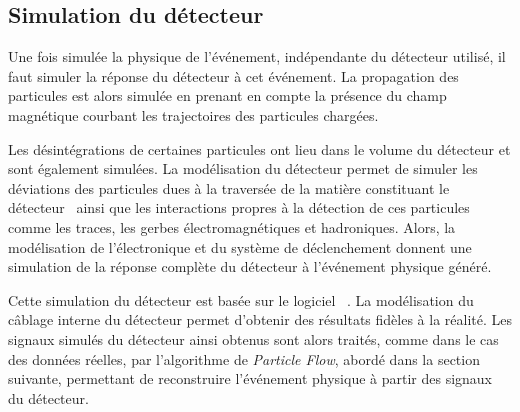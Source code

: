 \subsection{Simulation du détecteur}\label{chapter-LHC-section-MC-subsec-detector_sim}
Une fois simulée la physique de l'événement, indépendante du détecteur utilisé, il faut simuler la réponse du détecteur à cet événement.
La propagation des particules est alors simulée en prenant en compte la présence du champ magnétique courbant les trajectoires des particules chargées.
\par Les désintégrations de certaines particules ont lieu dans le volume du détecteur et sont également simulées.
La modélisation du détecteur permet de simuler les déviations des particules dues à la traversée de la matière constituant le détecteur~\cite{moliere_scat_1,moliere_scat_2} ainsi que les interactions propres à la détection de ces particules comme les traces, les gerbes électromagnétiques et hadroniques.
Alors, la modélisation de l'électronique et du système de déclenchement donnent une simulation de la réponse complète du détecteur à l'événement physique généré.
\par Cette simulation du détecteur est basée sur le logiciel
\GEANTfour~\cite{geant4_2003,geant4_2006,geant4_2016}.
La modélisation du câblage interne du détecteur permet d'obtenir des résultats fidèles à la réalité.
Les signaux simulés du détecteur ainsi obtenus sont alors traités, comme dans le cas des données réelles, par l'algorithme de \emph{Particle Flow}, abordé dans la section suivante, permettant de reconstruire l'événement physique à partir des signaux du détecteur.